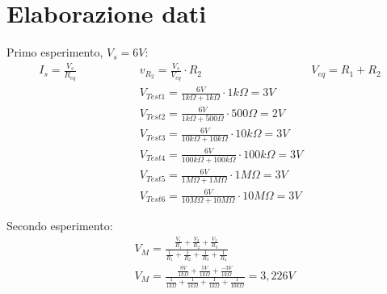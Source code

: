     \newpage

    \section{Elaborazione dati}
    Primo esperimento, $V_s = 6V$:
    \begin{align}
        I_s = \frac{V_s}{R_{eq}}  \hspace{2cm}   & v_{R_2} = \frac{V_s}{V_{eq}} \cdot R_2  \hspace{2cm} &  V_{eq} = R_1 + R_2 \\
        & V_{Test1} = \frac{6V}{1k\Omega + 1k\Omega} \cdot 1k\Omega = 3V \\
        & V_{Test2} = \frac{6V}{1k\Omega + 500\Omega} \cdot 500\Omega = 2V \\
        & V_{Test3} = \frac{6V}{10k\Omega + 10k\Omega} \cdot 10k\Omega = 3V \\
        & V_{Test4} = \frac{6V}{100k\Omega + 100k\Omega} \cdot 100k\Omega = 3V \\
        & V_{Test5} = \frac{6V}{1M\Omega + 1M\Omega} \cdot 1M\Omega = 3V \\
        & V_{Test6} = \frac{6V}{10M\Omega + 10M\Omega} \cdot 10M\Omega = 3V
    \end{align}

    Secondo esperimento:
    \begin{align}
       & V_M = \frac{\frac{V_1}{R_1} + \frac{V_2}{R_2} + \frac{V_3}{R_3}}{\frac{1}{R_1} + \frac{1}{R_2} + \frac{1}{R_3} + \frac{1}{R_4}}\\
       & V_M = \frac{\frac{8V}{1k\Omega} + \frac{5V}{1k\Omega} + \frac{-3V}{1k\Omega}}{\frac{1}{1k\Omega} + \frac{1}{1k\Omega} + \frac{1}{1k\Omega} + \frac{1}{10k\Omega}} = 3,226V
    \end{align}
    


